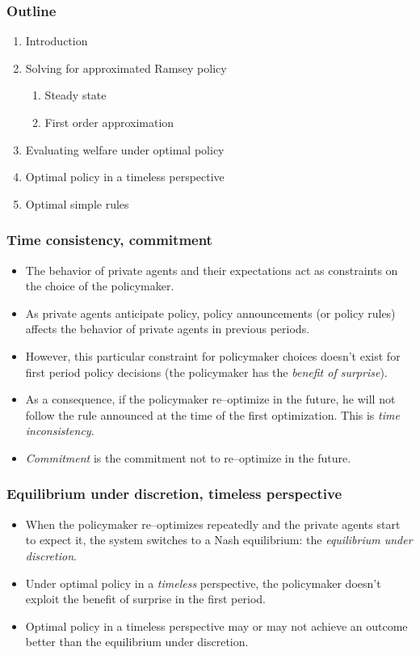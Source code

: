 \documentclass{beamer}
\begin{document}
\begin{frame}
  \frametitle{Outline}
  \begin{enumerate}
  \item {\red Introduction}
  \item Solving for approximated Ramsey policy
    \begin{enumerate}
    \item Steady state
    \item First order approximation
    \end{enumerate}
  \item Evaluating welfare under optimal policy
  \item Optimal policy in a timeless perspective
  \item Optimal simple rules
  \end{enumerate}
\end{frame}

\begin{frame}
  \frametitle{Time consistency, commitment}
  \begin{itemize}
  \item The behavior of private agents and their expectations act as constraints on the choice of the policymaker.
  \item As private agents anticipate policy, policy announcements (or policy rules) affects the behavior of private agents in previous periods.
  \item However, this particular constraint for policymaker choices doesn't exist for first period policy decisions (the policymaker has the \emph{benefit of surprise}).
  \item As a consequence, if the policymaker re--optimize in the future, he will not follow the rule announced at the time of the first optimization. This is \emph{time inconsistency}.
  \item \emph{Commitment} is the commitment not to re--optimize in the future.
\end{itemize}
\end{frame}

\begin{frame}
  \frametitle{Equilibrium under discretion, timeless perspective}
\begin{itemize}
  \item When the policymaker re--optimizes repeatedly and the private agents start to expect it, the system switches to a Nash equilibrium: the \emph{equilibrium under discretion}.
  \item Under optimal policy in a \emph{timeless} perspective, the policymaker doesn't exploit the benefit of surprise in the first period.
  \item Optimal policy in a timeless perspective may or may not achieve an outcome better than the equilibrium under discretion.
  \end{itemize}
\end{frame}
\end{document}
